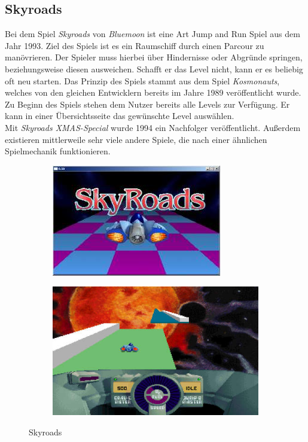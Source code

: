 \subsection{Skyroads}
Bei dem Spiel \textit{Skyroads} von \textit{Bluemoon} ist eine Art Jump and Run Spiel aus dem Jahr 1993. Ziel des Spiels ist es ein Raumschiff durch einen Parcour zu manövrieren. Der Spieler muss hierbei über Hindernisse oder Abgründe springen, beziehungsweise diesen ausweichen. Schafft er das Level nicht, kann er es beliebig oft neu starten. Das Prinzip des Spiels stammt aus dem Spiel \textit{Kosmonauts}, welches von den gleichen Entwicklern bereits im Jahre 1989 veröffentlicht wurde. Zu Beginn des Spiels stehen dem Nutzer bereits alle Levels zur Verfügung. Er kann in einer Übersichtsseite das gewünschte Level auswählen. \\
Mit \textit{Skyroads XMAS-Special} wurde 1994 ein Nachfolger veröffentlicht. Außerdem existieren mittlerweile sehr viele andere Spiele, die nach einer ähnlichen Spielmechanik funktionieren.
\begin{figure}[ht]
	\centering
	\begin{subfigure}{.45\textwidth}
	\centering
			\includegraphics[width=.9\textwidth]{gfx/recherche/skyroads1.jpg}
	\end{subfigure}
	\begin{subfigure}{.45\textwidth}
	\centering
			\includegraphics[width=.9\textwidth]{gfx/recherche/skyroads2.jpg}  
	\end{subfigure}
	\caption{Skyroads}
\end{figure}\\

